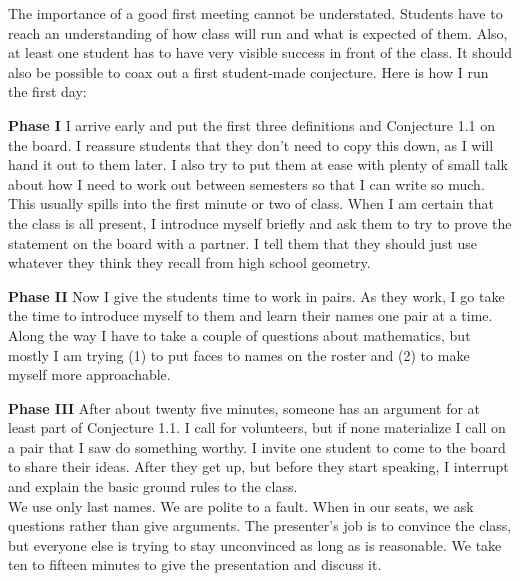 \documentclass{tufte-handout}
\theoremstyle{definition}
\begin{document}
The importance of a good first meeting cannot be understated.
Students have to reach an understanding of how class will run and what is expected of them.
Also, at least one student has to have very visible success in front of the class.
It should also be possible to coax out a first student-made conjecture.
Here is how I run the first day:\\[.1in]

\begin{compactdesc}
\item[\textbf{Phase I}] I arrive early and put the first three definitions and Conjecture 1.1 on the board.
I reassure students that they don't need to copy this down, as I will hand it out to them later.
I also try to put them at ease with plenty of small talk about how I need to work out between semesters so that I can write so much.
This usually spills into the first minute or two of class.
When I am certain that the class is all present, I introduce myself briefly and ask them to try to prove the statement on the board with a partner.
I tell them that they should just use whatever they think they recall from high school geometry.\\[.1in]

\item[\textbf{Phase II}] Now I give the students time to work in pairs.
As they work, I go take the time to introduce myself to them and learn their names one pair at a time.
Along the way I have to take a couple of questions about mathematics, but mostly I am trying (1) to put faces to names on the roster and (2) to make myself more approachable.\\[.1in]

\item[\textbf{Phase III}] After about twenty five minutes, someone has an argument for at least part of Conjecture 1.1.
I call for volunteers, but if none materialize I call on a pair that I saw do something worthy.
I invite one student to come to the board to share their ideas.
After they get up, but before they start speaking, I interrupt and explain the basic ground rules to the class.\\[.1in]

We use only last names.
We are polite to a fault.
When in our seats, we ask questions rather than give arguments.
The presenter's job is to convince the class, but everyone else is trying to stay unconvinced as long as is reasonable.
We take ten to fifteen minutes to give the presentation and discuss it.\\[.1in]


\end{compactdesc}
\end{document}
